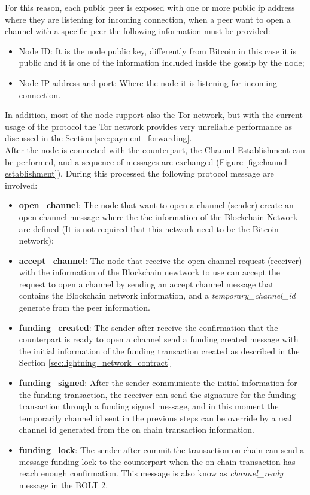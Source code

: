 For this reason, each public peer is exposed with one or more public ip address where
they are listening for incoming connection, when a peer want to open
a channel with a specific peer the following information must be provided:

\begin{itemize}
  \item Node ID: It is the node public key, differently from Bitcoin in this case it is public and it is one of the information included inside the gossip by the node;
  \item Node IP address and port: Where the node it is listening for incoming connection.
\end{itemize}

In addition, most of the node support also the Tor network, but with the current usage of the protocol the Tor network provides very unreliable
performance as discussed in the Section \ref{sec:payment_forwarding}.\\
After the node is connected with the counterpart, the Channel Establishment can be performed, and a sequence
of messages are exchanged (Figure \ref{fig:channel-establishment}). During this processed
the following protocol message are involved:

\begin{itemize}
  \item {\bf open\_channel}: The node that want to open a channel (sender) create an open channel message where the the information of the
        Blockchain Network are defined (It is not required that this network need to be the Bitcoin network);
  \item {\bf accept\_channel}: The node that receive the open channel request (receiver) with the information of the Blockchain newtwork to use
        can accept the request to open a channel by sending an accept channel message that contains the Blockchain network information, and
        a \emph{temporary\_channel\_id} generate from the peer information.
  \item {\bf funding\_created}: The sender after receive the confirmation that the counterpart is ready to open a channel
        send a funding created message with the initial information of the funding transaction created as described in the Section \ref{sec:lightning_network_contract}
  \item {\bf funding\_signed}: After the sender communicate the initial information for the funding transaction, the
        receiver can send the signature for the funding transaction through a funding signed message, and in this moment the temporarily
        channel id sent in the previous steps can be override by a real channel id generated from the on chain transaction information.
  \item {\bf funding\_lock}: The sender after commit the transaction on chain can send a message funding lock to the counterpart when
        the on chain transaction has reach enough confirmation. This message is also know as \emph{channel\_ready} message in the BOLT 2\cite{bolt2}.
\end{itemize}


